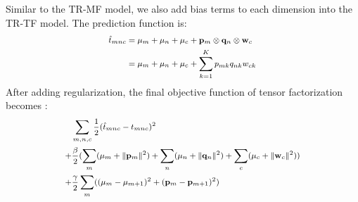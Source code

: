 Similar to the TR-MF model, we also add bias terms to each dimension into the TR-TF model. The prediction function is:
\begin{equation*}
\small
\begin{aligned}
\hat{t}_{mnc}
&=\mu_m+\mu_n+\mu_c + \mathbf{p}_m \otimes \mathbf{q}_n \otimes \mathbf{w}_c\\
&=\mu_m+\mu_n+\mu_c+\sum\limits_{k=1}^{K}{p_{mk} q_{nk} w_{ck}}
\end{aligned}
\end{equation*}
%
After adding regularization, the final objective function of tensor factorization becomes :\\
\begin{equation*}
\small
\begin{aligned}
&\sum\limits_{m, n, c} \frac{1}{2}(\hat{t}_{mnc}- t_{mnc})^2\\
+ &\frac{\beta}{2}(\sum_m(\mu_m + \|\mathbf{p}_m\|^2) + \sum_n(\mu_n + \|\mathbf{q}_n\|^2) + \sum_c(\mu_c + \|\mathbf{w}_c\|^2))\\
+ &\frac{\gamma}{2}\sum_m((\mu_m-\mu_{m+1})^2 + (\mathbf{p}_m-\mathbf{p}_{m+1})^2)\\
\end{aligned}
\end{equation*}


